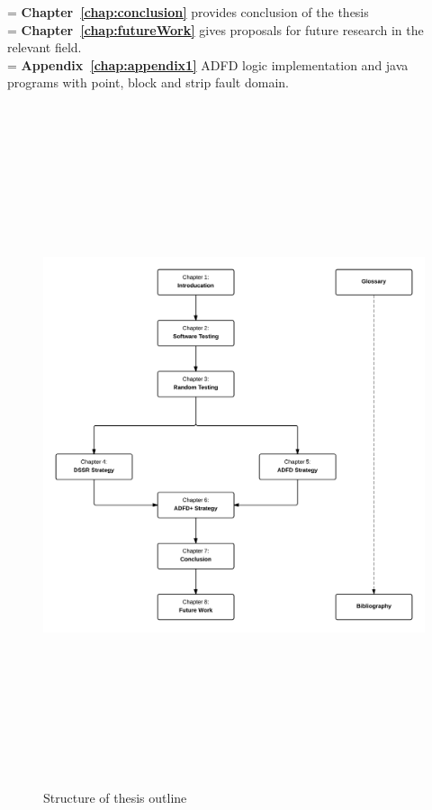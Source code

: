 \hangindent=\parindent
{}
\noindent
\textbf{Chapter~\ref{chap:conclusion}} provides conclusion of the thesis \\

\hangindent=\parindent
{}
\noindent
\textbf{Chapter~\ref{chap:futureWork}} gives proposals for future research in the relevant field. \\


 \hangindent=\parindent
 \noindent
 \textbf{Appendix~\ref{chap:appendix1}} ADFD logic implementation and java programs with point, block and strip fault domain.\\

\newpage
\begin{figure}[h]
	\centering
		\includegraphics[width=16cm, height=20cm ]{chapter1/thesisOutline.png}
		\caption{Structure of thesis outline}
	\label{fig:thesisOutline}
\end{figure}



